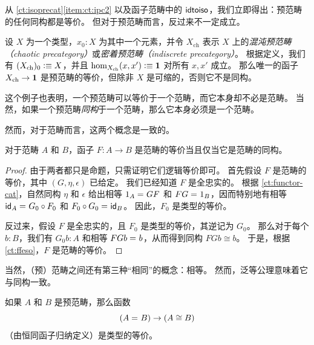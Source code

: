 从 \cref{ct:isoprecat}\ref{item:ct:ipc2} 以及函子范畴中的 $\idtoiso$，我们立即得出：预范畴的任何同构都是等价。
但对于预范畴而言，反过来不一定成立。

\begin{eg}\label{ct:chaotic}
  设 $X$ 为一个类型，$x_0:X$ 为其中一个元素，并令 $X_{\mathrm{ch}}$ 表示 $X$ 上的\emph{混沌预范畴（chaotic precategory）}或\emph{密着预范畴（indiscrete precategory）}。
  根据定义，我们有 $(X_{\mathrm{ch}})_0\defeq X$，并且 $\hom_{X_{\mathrm{ch}}}(x,x') \defeq \unit$ 对所有 $x,x'$ 成立。
  那么唯一的函子 $X_{\mathrm{ch}}\to \unit$ 是预范畴的等价，但除非 $X$ 是可缩的，否则它不是同构。

  这个例子也表明，一个预范畴可以等价于一个范畴，而它本身却不必是范畴。
  当然，如果一个预范畴\emph{同构}于一个范畴，那么它本身必须是一个范畴。
\end{eg}

然而，对于范畴而言，这两个概念是一致的。

\begin{lem}\label{ct:eqv-levelwise}
  对于范畴 $A$ 和 $B$，函子 $F:A\to B$ 是范畴的等价当且仅当它是范畴的同构。
\end{lem}

\begin{proof}
  由于两者都只是命题，只需证明它们逻辑等价即可。
  首先假设 $F$ 是范畴的等价，其中 $(G,\eta,\epsilon)$ 已给定。
  我们已经知道 $F$ 是全忠实的。
  根据 \cref{ct:functor-cat}，自然同构 $\eta$ 和 $\epsilon$ 给出相等 $\id{1_A}{GF}$ 和 $\id{FG}{1_B}$，因而特别地有相等 $\id{\idfunc[A]}{G_0\circ F_0}$ 和 $\id{F_0\circ G_0}{\idfunc[B]}$。
  因此，$F_0$ 是类型的等价。

  反过来，假设 $F$ 是全忠实的，且 $F_0$ 是类型的等价，其逆记为 $G_0$。
  那么对于每个 $b:B$，我们有 $G_0 b:A$ 和相等 $\id{FGb}{b}$，从而得到同构 $FGb\cong b$。
  于是，根据 \cref{ct:ffeso}，$F$ 是范畴的等价。
\end{proof}

当然，（预）范畴之间还有第三种``相同''的概念：相等。
然而，泛等公理意味着它与同构一致。

\begin{lem}\label{ct:cat-eq-iso}
  如果 $A$ 和 $B$ 是预范畴，那么函数
  \[(\id A B) \to (A\cong B)\]
  （由恒同函子归纳定义）是类型的等价。
\end{lem}

